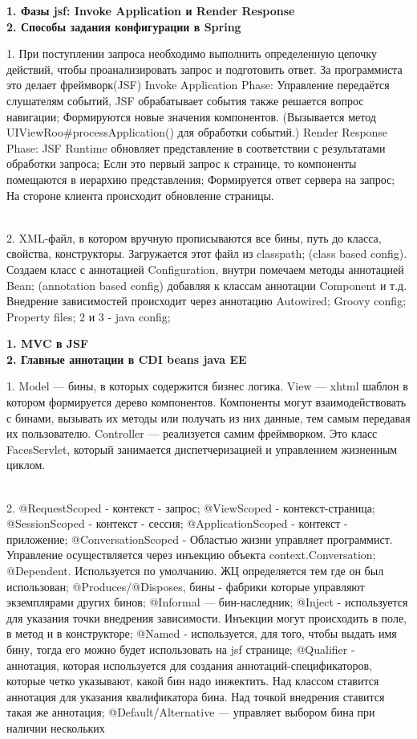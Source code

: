 \documentclass{article}
\newcommand{\bil}[4]{%
    \begin{minipage}{.3\textwidth}
        \textbf{1. #1} \\
        \textbf{2. #2}

        1. #3
        \\
        2. #4
    \end{minipage}
}
\begin{document}
\bil{Фазы jsf: Invoke Application и Render Response}{Способы задания конфигурации в Spring}{
    При поступлении запроса необходимо выполнить определенную цепочку действий, чтобы проанализировать запрос и подготовить ответ. За программиста это делает фреймворк(JSF)
    Invoke Application Phase: Управление передаётся слушателям событий, JSF обрабатывает события  также решается вопрос навигации; Формируются новые значения компонентов.
    (Вызывается метод UIViewRoo\#processApplication() для обработки событий.)
    Render Response Phase: JSF Runtime обновляет представление в соответствии с результатами обработки запроса; Если это первый запрос к странице, то компоненты помещаются в иерархию представления; Формируется ответ сервера на запрос; На стороне клиента происходит обновление страницы. 
}{
    XML-файл, в котором вручную прописываются все бины, путь до класса, свойства, конструкторы. Загружается этот файл из classpath; 
    (class based config). Создаем класс с аннотацией Configuration, внутри помечаем методы аннотацией Bean; 
    (annotation based config) добавляя к классам аннотации Component и т.д. Внедрение зависимостей происходит через аннотацию Autowired; 
    Groovy config;
    Property files;
    2 и 3 - java config;
}
\hfill
\bil{MVC в JSF}{Главные аннотации в CDI beans java EE}{
    Model — бины, в которых содержится бизнес логика. 
View — xhtml шаблон в котором формируется дерево компонентов. Компоненты могут взаимодействовать с бинами, вызывать их методы или получать из них данные, тем самым передавая их пользователю.
Controller — реализуется самим фреймворком. Это класс FacesServlet, который занимается диспетчеризацией и управлением жизненным циклом.
}{
    @RequestScoped - контекст - запрос;
    @ViewScoped - контекст-страница;
    @SessionScoped - контекст - сессия;
    @ApplicationScoped - контекст - приложение;
    @ConversationScoped - Областью жизни управляет программист. Управление осуществляется через инъекцию объекта context.Conversation;
    @Dependent.  Используется по умолчанию. ЖЦ определяется тем где он был использован;
    @Produces/@Disposes, бины - фабрики которые управляют экземплярами других бинов;
    @Informal — бин-наследник;
    @Inject - используется для указания точки внедрения зависимости. Инъекции могут происходить в поле, в метод и в конструкторе;
    @Named - используется, для того, чтобы выдать имя бину, тогда его можно будет использовать на jsf странице;
    @Qualifier - аннотация, которая используется для создания аннотаций-спецификаторов, которые четко указывают, какой бин надо инжектить. Над классом ставится аннотация для указания квалификатора бина. Над точкой внедрения ставится такая же аннотация;
    @Default/Alternative — управляет выбором бина при наличии нескольких
}
\end{document}
